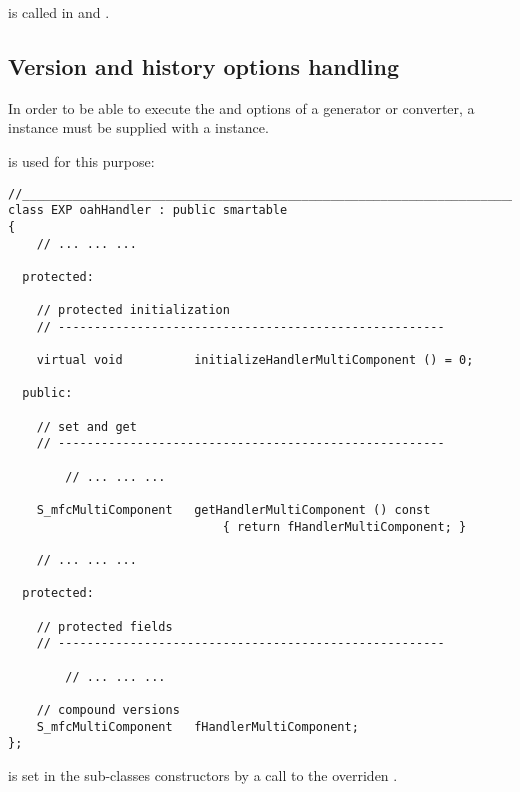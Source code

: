  is called in  and .


\subsection{Version and history options handling}\label{Version and history options handling}

In order to be able to execute the  and  options of a generator or converter, a  instance must be supplied with a  instance.

 is used for this purpose:
\begin{lstlisting}[language=CPlusPlus]
//_______________________________________________________________________________
class EXP oahHandler : public smartable
{
	// ... ... ...

  protected:

    // protected initialization
    // ------------------------------------------------------

    virtual void          initializeHandlerMultiComponent () = 0;

  public:

    // set and get
    // ------------------------------------------------------

		// ... ... ...

    S_mfcMultiComponent   getHandlerMultiComponent () const
                              { return fHandlerMultiComponent; }

	// ... ... ...

  protected:

    // protected fields
    // ------------------------------------------------------

		// ... ... ...

    // compound versions
    S_mfcMultiComponent   fHandlerMultiComponent;
};
\end{lstlisting}

 is set in the  sub-classes constructors by a call to the overriden .

